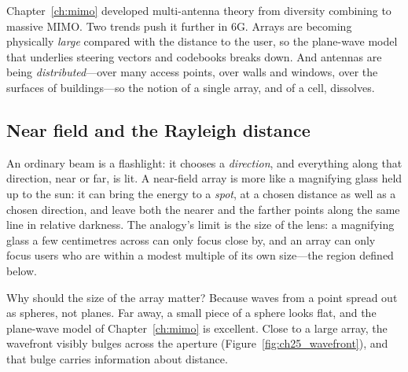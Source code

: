 Chapter~\ref{ch:mimo} developed multi-antenna theory from diversity combining to massive MIMO. Two
trends push it further in 6G. Arrays are becoming physically \emph{large} compared with the distance
to the user, so the plane-wave model that underlies steering vectors and codebooks breaks down. And
antennas are being \emph{distributed}---over many access points, over walls and windows, over the
surfaces of buildings---so the notion of a single array, and of a cell, dissolves.

\subsection{Near field and the Rayleigh distance}

\begin{analogy}
An ordinary beam is a flashlight: it chooses a \emph{direction}, and everything along that direction,
near or far, is lit. A near-field array is more like a magnifying glass held up to the sun: it can
bring the energy to a \emph{spot}, at a chosen distance as well as a chosen direction, and leave
both the nearer and the farther points along the same line in relative darkness. The analogy's limit
is the size of the lens: a magnifying glass a few centimetres across can only focus close by, and an
array can only focus users who are within a modest multiple of its own size---the region defined
below.
\end{analogy}

Why should the size of the array matter? Because waves from a point spread out as spheres, not
planes. Far away, a small piece of a sphere looks flat, and the plane-wave model of
Chapter~\ref{ch:mimo} is excellent. Close to a large array, the wavefront visibly bulges across the
aperture (Figure~\ref{fig:ch25_wavefront}), and that bulge carries information about distance.


